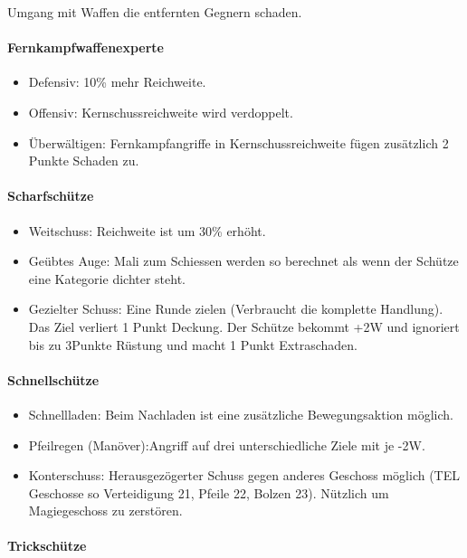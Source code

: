 \documentclass{article}
\begin{document}
Umgang mit Waffen die entfernten Gegnern schaden.

\paragraph{Fernkampfwaffenexperte}

\begin{itemize}
\item Defensiv: 10\% mehr Reichweite.
\item Offensiv: Kernschussreichweite wird verdoppelt.
\item Überwältigen: Fernkampfangriffe in Kernschussreichweite fügen zusätzlich 2 Punkte Schaden zu.
\end{itemize}

\paragraph{Scharfschütze}

\begin{itemize}
\item Weitschuss: Reichweite ist um 30\% erhöht.
\item Geübtes Auge: Mali zum Schiessen werden so berechnet als wenn der Schütze eine Kategorie dichter steht.
\item Gezielter Schuss: Eine Runde zielen (Verbraucht die komplette Handlung). Das Ziel verliert 1 Punkt Deckung. Der Schütze bekommt +2W und ignoriert bis zu 3Punkte Rüstung und macht 1 Punkt Extraschaden.
\end{itemize}

\paragraph{Schnellschütze}

\begin{itemize}
\item Schnellladen: Beim Nachladen ist eine zusätzliche Bewegungsaktion möglich.
\item Pfeilregen (Manöver):Angriff auf drei unterschiedliche Ziele mit je -2W.
\item Konterschuss: Herausgezögerter Schuss gegen anderes Geschoss möglich (TEL Geschosse so Verteidigung 21, Pfeile 22, Bolzen 23). Nützlich um Magiegeschoss zu zerstören.
\end{itemize}

\paragraph{Trickschütze}
\end{document}
